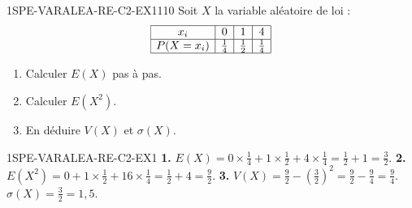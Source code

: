
\begin{exercice}{1SPE-VARALEA-RE-C2-EX1}{1}{10}
Soit $X$ la variable aléatoire de loi :
\[
\begin{array}{|c|c|c|c|}
\hline
x_i & 0 & 1 & 4 \\
\hline
P(X=x_i) & \frac{1}{4} & \frac{1}{2} & \frac{1}{4} \\
\hline
\end{array}
\]
\begin{enumerate}
  \item Calculer $E(X)$ pas à pas.
  \item Calculer $E(X^2)$.
  \item En déduire $V(X)$ et $\sigma(X)$.
\end{enumerate}
\end{exercice}


\begin{corrige}{1SPE-VARALEA-RE-C2-EX1}
\textbf{1.} $E(X) = 0 \times \frac{1}{4} + 1 \times \frac{1}{2} + 4 \times \frac{1}{4} = \frac{1}{2}+1 = \frac{3}{2}$.
\textbf{2.} $E(X^2) = 0+1 \times \frac{1}{2}+16 \times \frac{1}{4} = \frac{1}{2}+4 = \frac{9}{2}$.
\textbf{3.} $V(X) = \frac{9}{2} - \left(\frac{3}{2}\right)^2 = \frac{9}{2}-\frac{9}{4} = \frac{9}{4}$.
$\sigma(X) = \frac{3}{2} = 1{,}5$.
\end{corrige}
